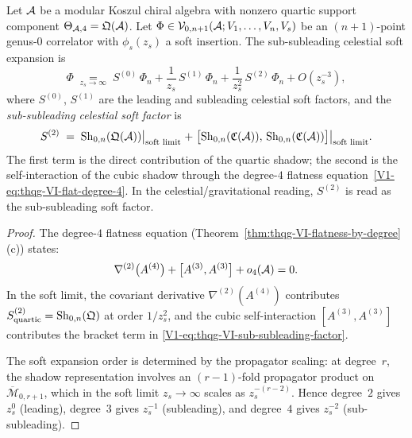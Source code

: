 \begin{theorem}
\label{thm:thqg-VI-sub-subleading-soft}
Let $\mathcal{A}$ be a modular Koszul chiral algebra with nonzero quartic
support component \(\Theta_{\mathcal{A},4}=\mathfrak Q(\mathcal{A})\).
Let $\Phi \in \mathcal{V}_{0,n+1}(\mathcal{A}; V_1, \dotsc, V_n, V_s)$ be an
$(n+1)$-point genus-$0$ correlator with $\phi_s(z_s)$ a soft
insertion. The sub-subleading celestial soft expansion is
\begin{equation}%
\Phi
\;\underset{z_s \to \infty}{=}\;
S^{(0)}\,\Phi_n
+ \frac{1}{z_s}\,S^{(1)}\,\Phi_n
+ \frac{1}{z_s^2}\,S^{(2)}\,\Phi_n
+ O(z_s^{-3}),
\end{equation}
where $S^{(0)}$, $S^{(1)}$ are the leading and subleading celestial
soft factors, and the \emph{sub-subleading celestial soft factor} is
\begin{equation}%
S^{(2)}
\;=\;
\Sh_{0,n}(\mathfrak{Q}(\cA))\bigl|_{\text{soft limit}}
\;+\;
\bigl[\Sh_{0,n}(\mathfrak{C}(\cA)),\,
\Sh_{0,n}(\mathfrak{C}(\cA))\bigr]\bigl|_{\text{soft limit}}.
\end{equation}
The first term is the direct contribution of the quartic shadow;
the second is the self-interaction of the cubic shadow through the
degree-$4$ flatness equation~\eqref{V1-eq:thqg-VI-flat-degree-4}. In the
celestial/gravitational reading, $S^{(2)}$ is read as the
sub-subleading soft factor.
\end{theorem}

\begin{proof}
The degree-$4$ flatness equation
(Theorem~\ref{thm:thqg-VI-flatness-by-degree}(c)) states:
\[
\nabla^{(2)}\bigl(A^{(4)}\bigr)
+ \bigl[A^{(3)}, A^{(3)}\bigr]
+ o_4(\mathcal{A})
= 0.
\]
In the soft limit, the covariant derivative $\nabla^{(2)}(A^{(4)})$
contributes $S^{(2)}_{\mathrm{quartic}} = \operatorname{Sh}_{0,n}(\mathfrak{Q})$
at order $1/z_s^2$, and the cubic self-interaction
$[A^{(3)}, A^{(3)}]$ contributes the bracket term in
\eqref{V1-eq:thqg-VI-sub-subleading-factor}.

The soft expansion order is determined by the propagator scaling:
at degree~$r$, the shadow representation involves an
$(r-1)$-fold propagator product on $\overline{\mathcal{M}}_{0,r+1}$,
which in the soft limit $z_s \to \infty$ scales as
$z_s^{-(r-2)}$. Hence degree~$2$ gives $z_s^0$ (leading),
degree~$3$ gives $z_s^{-1}$ (subleading), and degree~$4$ gives
$z_s^{-2}$ (sub-subleading).
\end{proof}

